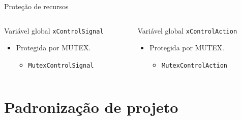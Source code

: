 \documentclass{if-beamer}
\begin{document}
\begin{frame}{Proteção de recursos}
	
	\begin{columns}
		
		\begin{column}{0.5\textwidth}
			
			\begin{block}{Variável global \texttt{xControlSignal}}
				
				\begin{itemize}
					\item Protegida por MUTEX.
					\begin{itemize}
						\item \texttt{MutexControlSignal}
						
					\end{itemize}
				\end{itemize}
				
			\end{block}
			
		\end{column}
		
		\begin{column}{0.5\textwidth}
			
			\pause
			
			\begin{block}{Variável global \texttt{xControlAction}}
				
				\begin{itemize}
					\item Protegida por MUTEX.
					\begin{itemize}
						\item \texttt{MutexControlAction}
						
					\end{itemize}
					
				\end{itemize}
				
			\end{block}
			
		\end{column}
		
	\end{columns}
	
\end{frame}


\section{Padronização de projeto}
\end{document}
